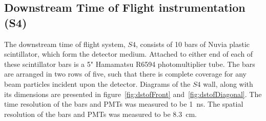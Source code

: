 	\subsection{Downstream Time of Flight instrumentation (S4)}
	
    The downstream time of flight system, $S4$, consists of 10 bars of Nuvia plastic scintillator, which form the detector medium. 
    Attached to either end of each of these scintillator bars is a 5" Hamamatsu R6594 photomultiplier tube. 
    The bars are arranged in two rows of five, such that there is complete coverage for any beam particles incident upon the detector. 
    Diagrams of the $S4$ wall, along with its dimensions are presented in figure~\ref{fig:dstofFront} and~\ref{fig:dstofDiagonal}.
    The time resolution of the bars and PMTs was measured to be 1~ns. The spatial resolution of the bars and PMTs was measured to be 8.3~cm.
    
